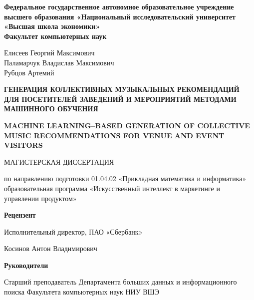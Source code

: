 \begin{titlepage}
\thispagestyle{empty}

\begin{center}

\vspace*{0.1cm}

{\small\bfseries
Федеральное государственное автономное образовательное учреждение высшего образования «Национальный исследовательский университет «Высшая школа экономики»\\
Факультет компьютерных наук
}

\vspace{0.5cm}

{
Елисеев Георгий Максимович\\
Паламарчук Владислав Максимович\\
Рубцов Артемий
}

\vspace{0.5cm}

{\bfseries
ГЕНЕРАЦИЯ КОЛЛЕКТИВНЫХ МУЗЫКАЛЬНЫХ РЕКОМЕНДАЦИЙ ДЛЯ ПОСЕТИТЕЛЕЙ ЗАВЕДЕНИЙ И МЕРОПРИЯТИЙ МЕТОДАМИ МАШИННОГО ОБУЧЕНИЯ
}

{\bfseries
MACHINE LEARNING–BASED GENERATION OF COLLECTIVE MUSIC RECOMMENDATIONS FOR VENUE AND EVENT VISITORS
}

{МАГИСТЕРСКАЯ ДИССЕРТАЦИЯ}

{\small
по направлению подготовки 01.04.02 «Прикладная математика и информатика»
образовательная программа «Искусственный интеллект в маркетинге и\\
управлении продуктом»
}

\end{center}

\vfill

\noindent
\begin{minipage}[t]{0.45\textwidth}
\textbf{Рецензент}

\vspace{0.6cm}

{\small
Исполнительный директор, ПАО «Сбербанк»
}

{\small
Косинов Антон Владимирович
}
\end{minipage}
\hfill
\begin{minipage}[t]{0.45\textwidth}
\raggedleft
\textbf{Руководители}

\vspace{0.6cm}

{\small
Старший преподаватель Департамента больших данных и информационного поиска Факультета компьютерных наук НИУ ВШЭ
}


\end{minipage}
\end{titlepage}

